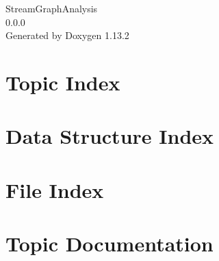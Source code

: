 \documentclass[twoside]{book}
\newcommand{\+}{\discretionary{\mbox{\scriptsize$\hookleftarrow$}}{}{}}
\newcommand{\clearemptydoublepage}{%
    \newpage{\pagestyle{empty}\cleardoublepage}%
  }
\begin{document}
  \raggedbottom
    \hypersetup{pageanchor=false,
                bookmarksnumbered=true,
                pdfencoding=unicode
               }
  \begin{titlepage}
  \vspace*{7cm}
  \begin{center}%
  {\Large Stream\+Graph\+Analysis}\\
  [1ex]\large 0.\+0.\+0 \\
  \vspace*{1cm}
  {\large Generated by Doxygen 1.13.2}\\
  \end{center}
  \end{titlepage}
  \clearemptydoublepage
  \tableofcontents
  \clearemptydoublepage
  \hypersetup{pageanchor=true}


\chapter{Topic Index}

\chapter{Data Structure Index}

\chapter{File Index}

\chapter{Topic Documentation}


\end{document}
